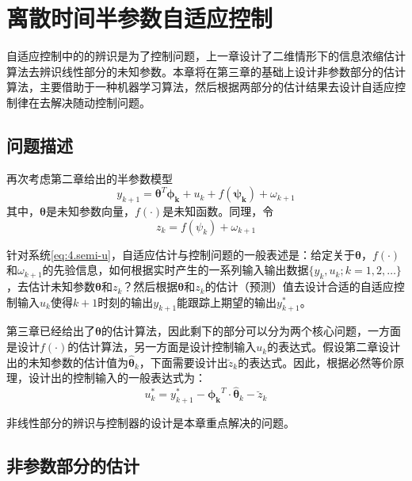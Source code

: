 \chapter{离散时间半参数自适应控制}\label{chap:4}
自适应控制中的的辨识是为了控制问题，上一章设计了二维情形下的信息浓缩估计算法去辨识线性部分的未知参数。本章将在第三章的基础上设计非参数部分的估计算法，主要借助于一种机器学习算法，然后根据两部分的估计结果去设计自适应控制律在去解决随动控制问题。
\section{问题描述}\label{sect:4.1}
再次考虑第二章给出的半参数模型
\begin{equation}%
\label{eq:4.semi-u}
y_{k+1} = \bm{\theta}^{T}\bm{\phi_{k}}+u_{k}+f(\bm{\psi_{k}})+\omega_{k+1}
\end{equation}
其中，$\bm{\theta}$是未知参数向量，$f(\cdot)$是未知函数。同理，令
\begin{equation}
z_{k} = f(\psi_{k}) + \omega_{k+1}
\end{equation}

针对系统\eqref{eq:4.semi-u}，自适应估计与控制问题的一般表述是：给定关于$\bm{\theta}$，$f(\cdot)$和$\omega_{k+1}$的先验信息，如何根据实时产生的一系列输入输出数据$\{y_{k},u_{k};k=1,2,\ldots\}$，去估计未知参数$\bm{\theta}$和$z_{k}$？然后根据$\bm{\theta}$和$z_{k}$的估计（预测）值去设计合适的自适应控制输入$u_{k}$使得$k+1$时刻的输出$y_{k+1}$能跟踪上期望的输出$y_{k+1}^{*}$。

第三章已经给出了$\bm{\theta}$的估计算法，因此剩下的部分可以分为两个核心问题，一方面是设计$f(\cdot)$的估计算法，另一方面是设计控制输入$u_{k}$的表达式。假设第二章设计出的未知参数的估计值为$\hat{\bm{\theta}}_{k}$，下面需要设计出$\breve{z}_{k}$的表达式。因此，根据必然等价原理，设计出的控制输入的一般表达式为：
\begin{equation}\label{eq:4.uk}
u_{k}^{*}=y_{k+1}^{*}-\bm{\phi_{k}}^{T}\cdot\hat{\bm{\theta}}_{k}-\breve{z}_{k}
\end{equation}

非线性部分的辨识与控制器的设计是本章重点解决的问题。

\section{非参数部分的估计}\label{sect:4.2}

